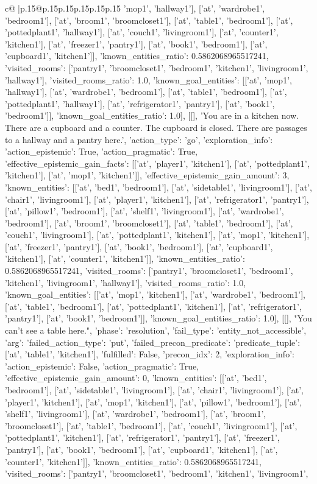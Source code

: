 \documentclass{article}
\begin{document}
{\begin{supertabular}{c@{$\;$}|p{.15\linewidth}@{}p{.15\linewidth}p{.15\linewidth}p{.15\linewidth}p{.15\linewidth}p{.15\linewidth}}
{{{'mop1', 'hallway1'], ['at', 'wardrobe1', 'bedroom1'], ['at', 'broom1', 'broomcloset1'], ['at', 'table1', 'bedroom1'], ['at', 'pottedplant1', 'hallway1'], ['at', 'couch1', 'livingroom1'], ['at', 'counter1', 'kitchen1'], ['at', 'freezer1', 'pantry1'], ['at', 'book1', 'bedroom1'], ['at', 'cupboard1', 'kitchen1']], 'known_entities_ratio': 0.5862068965517241, 'visited_rooms': ['pantry1', 'broomcloset1', 'bedroom1', 'kitchen1', 'livingroom1', 'hallway1'], 'visited_rooms_ratio': 1.0, 'known_goal_entities': [['at', 'mop1', 'hallway1'], ['at', 'wardrobe1', 'bedroom1'], ['at', 'table1', 'bedroom1'], ['at', 'pottedplant1', 'hallway1'], ['at', 'refrigerator1', 'pantry1'], ['at', 'book1', 'bedroom1']], 'known_goal_entities_ratio': 1.0}}], [[], 'You are in a kitchen now. There are a cupboard and a counter. The cupboard is closed. There are passages to a hallway and a pantry here.', {'action_type': 'go', 'exploration_info': {'action_epistemic': True, 'action_pragmatic': True, 'effective_epistemic_gain_facts': [['at', 'player1', 'kitchen1'], ['at', 'pottedplant1', 'kitchen1'], ['at', 'mop1', 'kitchen1']], 'effective_epistemic_gain_amount': 3, 'known_entities': [['at', 'bed1', 'bedroom1'], ['at', 'sidetable1', 'livingroom1'], ['at', 'chair1', 'livingroom1'], ['at', 'player1', 'kitchen1'], ['at', 'refrigerator1', 'pantry1'], ['at', 'pillow1', 'bedroom1'], ['at', 'shelf1', 'livingroom1'], ['at', 'wardrobe1', 'bedroom1'], ['at', 'broom1', 'broomcloset1'], ['at', 'table1', 'bedroom1'], ['at', 'couch1', 'livingroom1'], ['at', 'pottedplant1', 'kitchen1'], ['at', 'mop1', 'kitchen1'], ['at', 'freezer1', 'pantry1'], ['at', 'book1', 'bedroom1'], ['at', 'cupboard1', 'kitchen1'], ['at', 'counter1', 'kitchen1']], 'known_entities_ratio': 0.5862068965517241, 'visited_rooms': ['pantry1', 'broomcloset1', 'bedroom1', 'kitchen1', 'livingroom1', 'hallway1'], 'visited_rooms_ratio': 1.0, 'known_goal_entities': [['at', 'mop1', 'kitchen1'], ['at', 'wardrobe1', 'bedroom1'], ['at', 'table1', 'bedroom1'], ['at', 'pottedplant1', 'kitchen1'], ['at', 'refrigerator1', 'pantry1'], ['at', 'book1', 'bedroom1']], 'known_goal_entities_ratio': 1.0}}], [[], "You can't see a table here.", {'phase': 'resolution', 'fail_type': 'entity_not_accessible', 'arg': {'failed_action_type': 'put', 'failed_precon_predicate': {'predicate_tuple': ['at', 'table1', 'kitchen1'], 'fulfilled': False, 'precon_idx': 2}}, 'exploration_info': {'action_epistemic': False, 'action_pragmatic': True, 'effective_epistemic_gain_amount': 0, 'known_entities': [['at', 'bed1', 'bedroom1'], ['at', 'sidetable1', 'livingroom1'], ['at', 'chair1', 'livingroom1'], ['at', 'player1', 'kitchen1'], ['at', 'mop1', 'kitchen1'], ['at', 'pillow1', 'bedroom1'], ['at', 'shelf1', 'livingroom1'], ['at', 'wardrobe1', 'bedroom1'], ['at', 'broom1', 'broomcloset1'], ['at', 'table1', 'bedroom1'], ['at', 'couch1', 'livingroom1'], ['at', 'pottedplant1', 'kitchen1'], ['at', 'refrigerator1', 'pantry1'], ['at', 'freezer1', 'pantry1'], ['at', 'book1', 'bedroom1'], ['at', 'cupboard1', 'kitchen1'], ['at', 'counter1', 'kitchen1']], 'known_entities_ratio': 0.5862068965517241, 'visited_rooms': ['pantry1', 'broomcloset1', 'bedroom1', 'kitchen1', 'livingroom1', }}}
\end{supertabular}}
\end{document}
